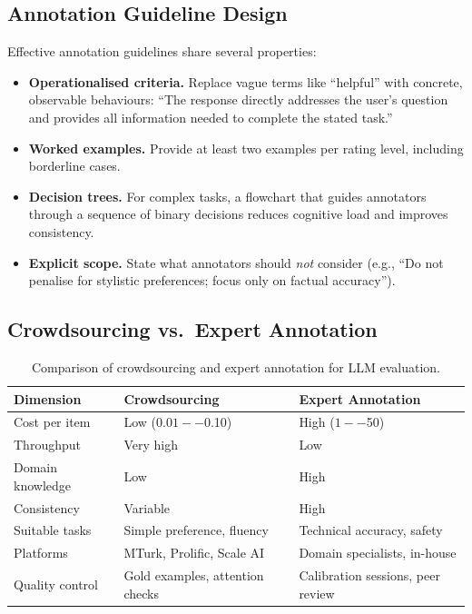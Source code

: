 \subsection{Annotation Guideline Design}
\label{annotation-guideline-design}

Effective annotation guidelines share several properties:

\begin{itemize}
  \item \textbf{Operationalised criteria.} Replace vague terms like ``helpful'' with concrete, observable behaviours: ``The response directly addresses the user’s question and provides all information needed to complete the stated task.''
  \item \textbf{Worked examples.} Provide at least two examples per rating level, including borderline cases.
  \item \textbf{Decision trees.} For complex tasks, a flowchart that guides annotators through a sequence of binary decisions reduces cognitive load and improves consistency.
  \item \textbf{Explicit scope.} State what annotators should \emph{not} consider (e.g., ``Do not penalise for stylistic preferences; focus only on factual accuracy'').
\end{itemize}

\subsection{Crowdsourcing vs.~Expert Annotation}
\label{crowdsourcing-vs.-expert-annotation}

\begin{table}[ht!]
\centering
\caption{Comparison of crowdsourcing and expert annotation for LLM evaluation.}
\begin{tabular}{@{}lp{5cm}p{8cm}@{}}
\toprule
\textbf{Dimension} & \textbf{Crowdsourcing} & \textbf{Expert Annotation} \\
\midrule
Cost per item & Low ($0.01--$0.10) & High ($1--$50) \\
Throughput & Very high & Low \\
Domain knowledge & Low & High \\
Consistency & Variable & High \\
Suitable tasks & Simple preference, fluency & Technical accuracy, safety \\
Platforms & MTurk, Prolific, Scale AI & Domain specialists, in-house \\
Quality control & Gold examples, attention checks & Calibration sessions, peer review \\
\bottomrule
\end{tabular}
\end{table}

